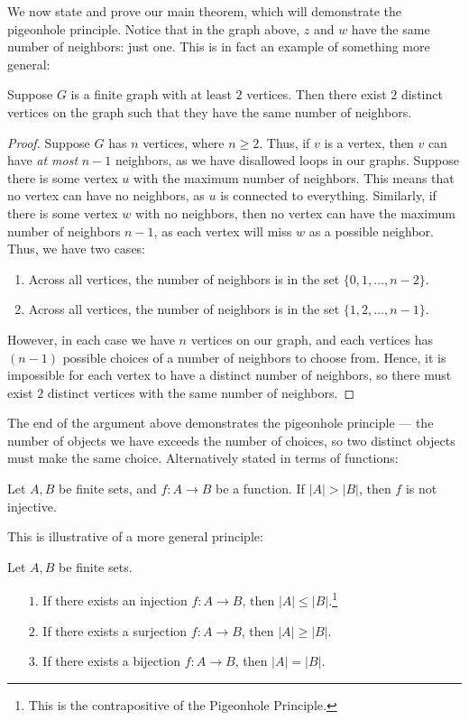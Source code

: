 \documentclass{article}
\begin{document}
We now state and prove our main theorem, which will demonstrate the pigeonhole principle. Notice that in the graph above, $z$ and $w$ have the same number of neighbors: just one. This is in fact an example of something more general:
\begin{theorem}
Suppose $G$ is a finite graph with at least $2$ vertices. Then there exist $2$ distinct vertices on the graph such that they have the same number of neighbors.
\end{theorem}
\begin{proof}
Suppose $G$ has $n$ vertices, where $n\geq 2$. Thus, if $v$ is a vertex, then $v$ can have \textit{at most} $n-1$ neighbors, as we have disallowed loops in our graphs. Suppose there is some vertex $u$ with the maximum number of neighbors. This means that no vertex can have no neighbors, as $u$ is connected to everything. Similarly, if there is some vertex $w$ with no neighbors, then no vertex can have the maximum number of neighbors $n-1$, as each vertex will miss $w$ as a possible neighbor. Thus, we have two cases:
\begin{enumerate}
    \item Across all vertices, the number of neighbors is in the set $\{0, 1, \ldots, n-2\}$.
    \item Across all vertices, the number of neighbors is in the set $\{1, 2, \ldots, n-1\}$.
\end{enumerate}
However, in each case we have $n$ vertices on our graph, and each vertices has $(n-1)$ possible choices of a number of neighbors to choose from. Hence, it is impossible for each vertex to have a distinct number of neighbors, so there must exist $2$ distinct vertices with the same number of neighbors.
\end{proof}
The end of the argument above demonstrates the pigeonhole principle --- the number of objects we have exceeds the number of choices, so two distinct objects must make the same choice. Alternatively stated in terms of functions:
\begin{theorem}
Let $A, B$ be finite sets, and $f: A\to B$ be a function. If $|A| > |B|$, then $f$ is not injective.
\end{theorem}
This is illustrative of a more general principle:
\begin{theorem}
Let $A, B$ be finite sets.
\begin{enumerate}
    \item[$1.$] If there exists an injection $f: A\to B$, then $|A| \leq |B|$.\footnote{This is the contrapositive of the Pigeonhole Principle.}
    \item[$2.$] If there exists a surjection $f: A\to B$, then $|A| \geq |B|$.
    \item[$3.$] If there exists a bijection $f: A\to B$, then $|A| = |B|$.
\end{enumerate}
\end{theorem}
\end{document}

